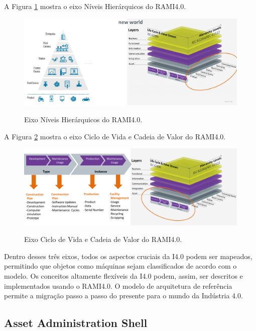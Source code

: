 \documentclass[
	12pt,				%
	oneside,			%
	a4paper,			%
	english,			%
	brazil				%
]{abntex2}
\begin{document}
	A Figura \ref{fig:eixo_niveishierarquicos} mostra o eixo Níveis Hierárquicos do RAMI4.0.
	
	\begin{figure}[H]
		\centering
		\caption{Eixo Níveis Hierárquicos do RAMI4.0.}
		\includegraphics[width=1\textwidth]{eixo_niveishierarquicos.png}
		\label{fig:eixo_niveishierarquicos}
	\end{figure}

	A Figura \ref{fig:eixo_ciclodevida} mostra o eixo Ciclo de Vida e Cadeia de Valor do RAMI4.0.
	
	\begin{figure}[H]
		\centering
		\caption{Eixo Ciclo de Vida e Cadeia de Valor do RAMI4.0.}
		\includegraphics[width=1\textwidth]{eixo_ciclodevida.png}
		\label{fig:eixo_ciclodevida}
	\end{figure}

	
	
	Dentro desses três eixos, todos os aspectos cruciais da I4.0 podem ser mapeados, permitindo que objetos como máquinas sejam classificados de acordo com o modelo. Os conceitos altamente flexíveis da I4.0 podem, assim, ser descritos e implementados usando o RAMI4.0. O modelo de arquitetura de referência permite a migração passo a passo do presente para o mundo da Indústria 4.0.
	
	\pagebreak
	\subsection{Asset Administration Shell}
	
\end{document}

